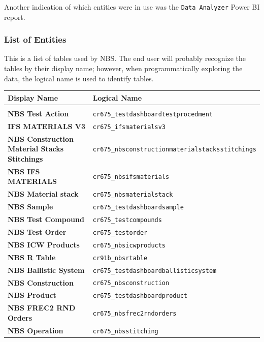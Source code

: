 Another indication of which entities were in use was the \texttt{Data Analyzer} Power BI report.

\newpage

\subsubsection{List of Entities}

This is a list of tables used by NBS. The end user will probably recognize the tables by their display name; however, when programmatically exploring the data, the logical name is used to identify tables.

\begin{footnotesize}
	\begin{tabularx}{\textwidth}{l|l}
		\textbf{Display Name} & \textbf{Logical Name} \\\hline\\
		\textbf{NBS Test Action} & \texttt{cr675\_testdashboardtestprocedment} \\[0.5em]
		\textbf{IFS MATERIALS V3} & \texttt{cr675\_ifsmaterialsv3} \\[0.5em]
		\textbf{NBS Construction Material Stacks Stitchings} & \texttt{cr675\_nbsconstructionmaterialstacksstitchings} \\[0.5em]
		\textbf{NBS IFS MATERIALS} & \texttt{cr675\_nbsifsmaterials} \\[0.5em]
		\textbf{NBS Material stack} & \texttt{cr675\_nbsmaterialstack} \\[0.5em]
		\textbf{NBS Sample} & \texttt{cr675\_testdashboardsample} \\[0.5em]
		\textbf{NBS Test Compound} & \texttt{cr675\_testcompounds} \\[0.5em]
		\textbf{NBS Test Order} & \texttt{cr675\_testorder} \\[0.5em]
		\textbf{NBS ICW Products} & \texttt{cr675\_nbsicwproducts} \\[0.5em]
		\textbf{NBS R Table} & \texttt{cr91b\_nbsrtable} \\[0.5em]
		\textbf{NBS Ballistic System} & \texttt{cr675\_testdashboardballisticsystem} \\[0.5em]
		\textbf{NBS Construction} & \texttt{cr675\_nbsconstruction} \\[0.5em]
		\textbf{NBS Product} & \texttt{cr675\_testdashboardproduct} \\[0.5em]
		\textbf{NBS FREC2 RND Orders} & \texttt{cr675\_nbsfrec2rndorders} \\[0.5em]
		\textbf{NBS Operation} & \texttt{cr675\_nbsstitching} \\[0.5em]

\end{tabularx}
\end{footnotesize}
